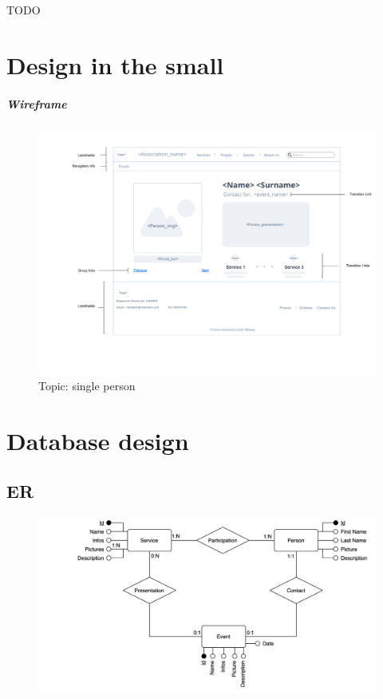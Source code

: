 \documentclass[a4paper, 11pt, parskip=half, headsepline]{scrreprt}
\begin{document}
TODO

\chapter{Design in the small}
\paragraph{Wireframe}

\begin{figure}[H]
    \centering
    \includegraphics[width=\linewidth, keepaspectratio]{wireframes/KindOfTopic-Person}
    \caption{Topic: single person}
    \label{fig:wireframe_single_person}
\end{figure}


\chapter{Database design}

\section{ER}

\begin{figure}[H]
    \centering
    \includegraphics[width=0.85\linewidth, keepaspectratio]{DB/ER}
\end{figure}
\end{document}
